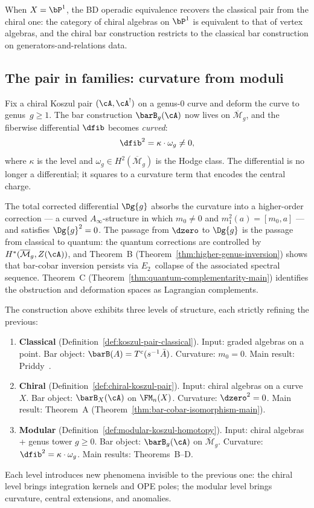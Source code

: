 When $X = \bP^1$, the BD operadic equivalence recovers the classical pair from the chiral one: the category of chiral algebras on $\bP^1$ is equivalent to that of vertex algebras, and the chiral bar construction restricts to the classical bar construction on generators-and-relations data.

\subsection{The pair in families: curvature from moduli}

Fix a chiral Koszul pair $(\cA, \cA^!)$ on a genus-$0$ curve and deform the curve to genus~$g \geq 1$.  The bar construction
$\barB_g(\cA)$ now lives on $\overline{\mathcal{M}}_g$, and the
fiberwise differential $\dfib$ becomes \emph{curved}:
\[
  \dfib^2 = \kappa \cdot \omega_g \neq 0,
\]
where $\kappa$ is the level and $\omega_g \in H^2(\overline{\mathcal{M}}_g)$
is the Hodge class.  The differential is no longer a differential; it squares to a curvature term that encodes the central charge.

The total corrected differential $\Dg{g}$ absorbs the curvature into a higher-order correction --- a curved $A_\infty$-structure in which $m_0 \neq 0$ and $m_1^2(a) = [m_0, a]$ --- and satisfies $\Dg{g}^2 = 0$.  The passage from $\dzero$ to $\Dg{g}$ is the passage from classical to quantum: the quantum corrections are controlled by $H^*(\overline{\mathcal{M}}_g, Z(\cA))$, and Theorem~B (Theorem~\ref{thm:higher-genus-inversion}) shows that bar-cobar inversion persists via $E_2$~collapse of the associated spectral sequence.  Theorem~C (Theorem~\ref{thm:quantum-complementarity-main}) identifies the obstruction and deformation spaces as Lagrangian complements.

\begin{remark}\label{rem:three-koszul-levels}
The construction above exhibits three levels of structure, each
strictly refining the previous:
\begin{enumerate}[leftmargin=2em]
\item \textbf{Classical} (Definition~\ref{def:koszul-pair-classical}).
  Input: graded algebras on a point.  Bar object: $\barB(A) = T^c(s^{-1}\bar{A})$.
  Curvature: $m_0 = 0$.  Main result: Priddy~\cite{Priddy70}.
\item \textbf{Chiral} (Definition~\ref{def:chiral-koszul-pair}).
  Input: chiral algebras on a curve~$X$.  Bar object: $\barB_X(\cA)$
  on $\FM_n(X)$.  Curvature: $\dzero^2 = 0$.  Main result: Theorem~A
  (Theorem~\ref{thm:bar-cobar-isomorphism-main}).
\item \textbf{Modular} (Definition~\ref{def:modular-koszul-homotopy}).
  Input: chiral algebras + genus tower $g \geq 0$.  Bar object:
  $\barB_g(\cA)$ on $\overline{\mathcal{M}}_g$.  Curvature:
  $\dfib^2 = \kappa \cdot \omega_g$.  Main results: Theorems~B--D.
\end{enumerate}
Each level introduces new phenomena invisible to the previous one:
the chiral level brings integration kernels and OPE poles; the
modular level brings curvature, central extensions, and anomalies.
\end{remark}

